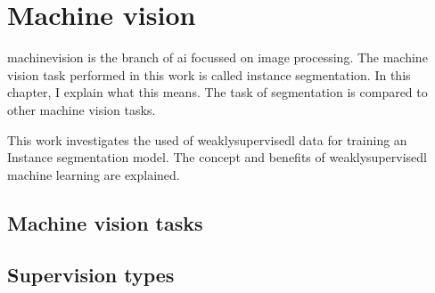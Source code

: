 \chapter{Machine vision}

\Gls{machinevision} is the branch of \Gls{ai} focussed on image processing.
The machine vision task performed in this work is called instance \Gls{segmentation}.
In this chapter, I explain what this means. 
The task of segmentation is compared to other machine vision tasks.

This work investigates the used of \Gls{weaklysupervisedl} data for training an Instance segmentation model. 
The concept and benefits of \Gls{weaklysupervisedl} machine learning are explained.

\section{Machine vision tasks}



\section{Supervision types}

